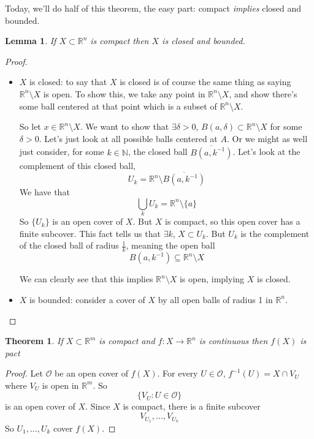 \documentclass{article}
\newtheorem{theorem}{Theorem}
\newtheorem{lemma}{Lemma}
\newcommand{\reals}[0]{\mathbb{R}}
\newcommand{\nats}[0]{\mathbb{N}}
\newcommand{\mc}[1]{\mathcal{#1}}
\begin{document}
Today, we'll do half of this theorem, the easy part: compact \textit{implies} closed and bounded.
\begin{lemma}
  If \(X \subset \reals^n\) is compact then \(X\) is closed and bounded.
\end{lemma}
\begin{proof}
  \begin{itemize}
    \item \(X\) is closed: to say that \(X\) is closed is of course the same thing as saying \(\reals^n \setminus X\) is open. To show this, we take any point in \(\reals^n \setminus X\), and show there's some ball centered at that point which is a subset of \(\reals^n \setminus X\).

    So let \(x \in \reals^n \setminus X\). We want to show that \(\exists \delta > 0\), \(B(a, \delta) \subset \reals^n \setminus X\) for some \(\delta > 0\). Let's just look at all possible balls centered at \(A\). Or we might as well just consider, for some \(k \in \nats\), the closed ball \(\overline{B(a, k^{-1})}\). Let's look at the complement of this closed ball,
    \begin{equation}U_k = \reals^n \setminus \overline{B(a, k^{-1})}\end{equation}
    We have that
    \begin{equation}\bigcup_kU_k = \reals^n\setminus\{a\}\end{equation}
    So \(\{U_k\}\) is an open cover of \(X\). But \(X\) is compact, so this open cover has a finite subcover. This fact tells us that \(\exists k\), \(X \subset U_k\). But \(U_k\) is the complement of the closed ball of radius \(\frac{1}{k}\), meaning the open ball
    \begin{equation}B(a, k^{-1}) \subseteq \reals^n \setminus X\end{equation}

    We can clearly see that this implies \(\reals^n \setminus X\) is open, implying \(X\) is closed.

    \item \(X\) is bounded:  consider a cover of \(X\) by all open balls of radius 1 in \(\reals^n\).
  \end{itemize}
\end{proof}

\begin{theorem}
  If \(X \subset \reals^m\) is compact and \(f: X \to \reals^n\) is continuous then \(f(X)\) is pact
\end{theorem}
\begin{proof}
  Let \(\mc{O}\) be an open cover of \(f(X)\). For every \(U \in \mc{O}\), \(f^{-1}(U) = X \cap V_U\) where \(V_U\) is open in \(\reals^m\). So
  \begin{equation}\{V_U : U \in \mc{O}\}\end{equation}
  is an open cover of \(X\). Since \(X\) is compact, there is a finite subcover
  \begin{equation}V_{U_1},...,V_{U_k}\end{equation}
  So \(U_1,...,U_k\) cover \(f(X)\).
\end{proof}
\end{document}
